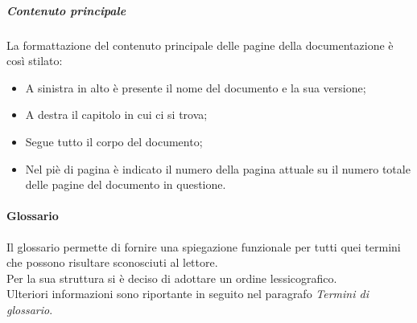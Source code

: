 \subparagraph{Contenuto principale}
La formattazione del contenuto principale delle pagine della documentazione è così stilato:
\begin{itemize}
	\item A sinistra in alto è presente il nome del documento e la sua versione;
	\item A destra il capitolo in cui ci si trova;
	\item Segue tutto il corpo del documento;
	\item Nel piè di pagina è indicato il numero della pagina attuale su il numero totale delle pagine del documento in questione. 
\end{itemize}

\paragraph{Glossario}
Il glossario permette di fornire una spiegazione funzionale per tutti quei termini che possono risultare sconosciuti al lettore.\\
Per la sua struttura si è deciso di adottare un ordine lessicografico.\\
Ulteriori informazioni sono riportante in seguito nel paragrafo \textit{Termini di glossario}.

